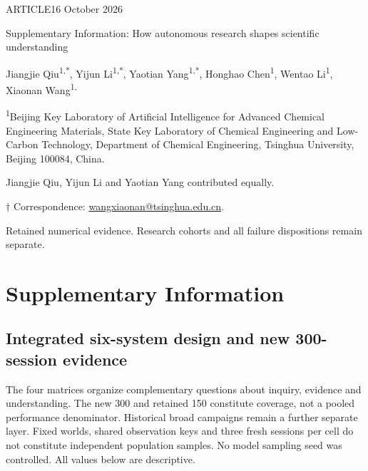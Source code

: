 \documentclass[10pt,a4paper]{article}
\begin{document}
{\sffamily\small ARTICLE\hfill 16 October 2026\par}
\vspace{8pt}
{\sffamily\LARGE\bfseries\raggedright{} Supplementary Information: How autonomous research shapes scientific understanding\par}
\vspace{8pt}
{\normalsize Jiangjie Qiu\textsuperscript{1,*}, Yijun Li\textsuperscript{1,*}, Yaotian Yang\textsuperscript{1,*}, Honghao Chen\textsuperscript{1}, Wentao Li\textsuperscript{1}, Xiaonan Wang\textsuperscript{1,\textdagger}\par}
{\footnotesize\textsuperscript{1}Beijing Key Laboratory of Artificial Intelligence for Advanced Chemical Engineering Materials, State Key Laboratory of Chemical Engineering and Low-Carbon Technology, Department of Chemical Engineering, Tsinghua University, Beijing 100084, China.\par}
{\footnotesize * Jiangjie Qiu, Yijun Li and Yaotian Yang contributed equally.\par}
{\footnotesize $\dagger$ Correspondence: \href{mailto:wangxiaonan@tsinghua.edu.cn}{wangxiaonan@tsinghua.edu.cn}.\par}
\vspace{6pt}
{\sffamily\footnotesize Retained numerical evidence. Research cohorts and all failure dispositions remain separate.\par}
\vspace{8pt}




\section{Supplementary Information}\label{supplementary-information}

\subsection{Integrated six-system design and new 300-session evidence}\label{integrated-six-system-design-and-new-300-session-evidence}

The four matrices organize complementary questions about inquiry, evidence and understanding. The new 300 and retained 150 constitute coverage, not a pooled performance denominator. Historical broad campaigns remain a further separate layer. Fixed worlds, shared observation keys and three fresh sessions per cell do not constitute independent population samples. No model sampling seed was controlled. All values below are descriptive.
\end{document}
